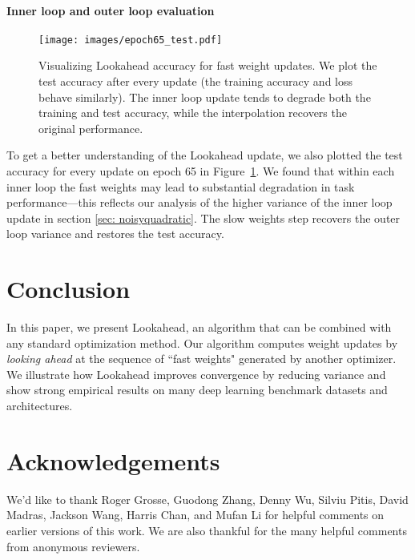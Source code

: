 \documentclass{article}
\begin{document}
\paragraph{Inner loop and outer loop evaluation}

\begin{figure}[t!]
    \centering
                            \texttt{[image: images/epoch65\_test.pdf]}
        \caption{Visualizing Lookahead accuracy for  fast weight updates. We plot the test accuracy after every update (the training accuracy and loss behave similarly). The inner loop update tends to degrade both the training and test accuracy, while the interpolation recovers the original performance.}
        \label{fig:cifar-every-batch}
\end{figure}

To get a better understanding of the Lookahead update, we also plotted the test accuracy for every update on epoch 65 in Figure~\ref{fig:cifar-every-batch}. We found that within each inner loop the fast weights may lead to substantial degradation in task performance---this reflects our analysis of the higher variance of the inner loop update in section \ref{sec: noisyquadratic}. The slow weights step recovers the outer loop variance and restores the test accuracy.





  \section{Conclusion}
\label{sec:conclusion}

In this paper, we present Lookahead, an algorithm that can be combined with any standard optimization method. Our algorithm computes weight updates by \emph{looking ahead} at the sequence of ``fast weights" generated by another optimizer. We illustrate how Lookahead improves convergence by reducing variance and show strong empirical results on many deep learning benchmark datasets and architectures. 

\newpage



 \section*{Acknowledgements}

We'd like to thank Roger Grosse, Guodong Zhang, Denny Wu, Silviu Pitis, David Madras, Jackson Wang, Harris Chan, and Mufan Li for helpful comments on earlier versions of this work. We are also thankful for the many helpful comments from anonymous reviewers. 


\clearpage
\pagebreak
\end{document}
